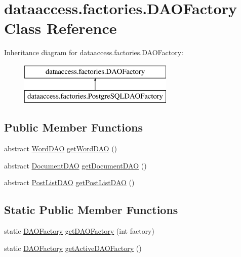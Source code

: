 \hypertarget{classdataaccess_1_1factories_1_1_d_a_o_factory}{\section{dataaccess.\-factories.\-D\-A\-O\-Factory \-Class \-Reference}
\label{classdataaccess_1_1factories_1_1_d_a_o_factory}
}
\-Inheritance diagram for dataaccess.\-factories.\-D\-A\-O\-Factory\-:\begin{figure}[H]
\begin{center}
\leavevmode
\includegraphics[height=2.000000cm]{classdataaccess_1_1factories_1_1_d_a_o_factory}
\end{center}
\end{figure}
\subsection*{\-Public \-Member \-Functions}
\begin{DoxyCompactItemize}
\item 
abstract \hyperlink{interfacedataaccess_1_1dao_1_1_word_d_a_o}{\-Word\-D\-A\-O} \hyperlink{classdataaccess_1_1factories_1_1_d_a_o_factory_a221a85bee4a075cbe37fc5acce7ba339}{get\-Word\-D\-A\-O} ()
\item 
abstract \hyperlink{interfacedataaccess_1_1dao_1_1_document_d_a_o}{\-Document\-D\-A\-O} \hyperlink{classdataaccess_1_1factories_1_1_d_a_o_factory_abac444c4c5d3e3efed06d705dcaf5071}{get\-Document\-D\-A\-O} ()
\item 
abstract \hyperlink{interfacedataaccess_1_1dao_1_1_post_list_d_a_o}{\-Post\-List\-D\-A\-O} \hyperlink{classdataaccess_1_1factories_1_1_d_a_o_factory_a009cb6291e5e866156029f5c976cc2f3}{get\-Post\-List\-D\-A\-O} ()
\end{DoxyCompactItemize}
\subsection*{\-Static \-Public \-Member \-Functions}
\begin{DoxyCompactItemize}
\item 
static \hyperlink{classdataaccess_1_1factories_1_1_d_a_o_factory}{\-D\-A\-O\-Factory} \hyperlink{classdataaccess_1_1factories_1_1_d_a_o_factory_a864f26b4b95f2f624a36b22b56fd1110}{get\-D\-A\-O\-Factory} (int factory)
\item 
static \hyperlink{classdataaccess_1_1factories_1_1_d_a_o_factory}{\-D\-A\-O\-Factory} \hyperlink{classdataaccess_1_1factories_1_1_d_a_o_factory_a525efdb633c40ced45c0d2f916887ddc}{get\-Active\-D\-A\-O\-Factory} ()
\end{DoxyCompactItemize}

